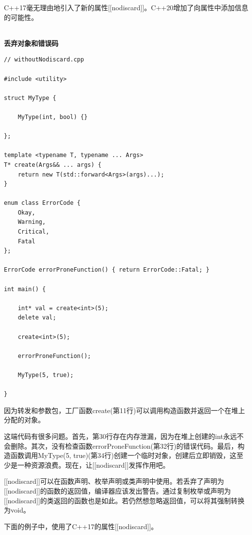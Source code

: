 
C++17毫无理由地引入了新的属性[[nodiscard]]。C++20增加了向属性中添加信息的可能性。

\hspace*{\fill} \\ %
\noindent
\textbf{丢弃对象和错误码}
\begin{lstlisting}[style=styleCXX]
// withoutNodiscard.cpp

#include <utility>

struct MyType {

	MyType(int, bool) {}

};

template <typename T, typename ... Args>
T* create(Args&& ... args) {
	return new T(std::forward<Args>(args)...);
}

enum class ErrorCode {
	Okay,
	Warning,
	Critical,
	Fatal
};

ErrorCode errorProneFunction() { return ErrorCode::Fatal; }

int main() {

	int* val = create<int>(5);
	delete val;
	
	create<int>(5);
	
	errorProneFunction();
	
	MyType(5, true);

}
\end{lstlisting}

因为转发和参数包，工厂函数create(第11行)可以调用构造函数并返回一个在堆上分配的对象。

这端代码有很多问题。首先，第30行存在内存泄漏，因为在堆上创建的int永远不会删除。其次，没有检查函数errorProneFunction(第32行)的错误代码。最后，构造函数调用MyType(5, true)(第34行)创建一个临时对象，创建后立即销毁，这至少是一种资源浪费。现在，让[[nodiscard]]发挥作用吧。

[[nodiscard]]可以在函数声明、枚举声明或类声明中使用。若丢弃了声明为[[nodiscard]]的函数的返回值，编译器应该发出警告。通过复制枚举或声明为[[nodiscard]]的类返回的函数也是如此。若仍然想忽略返回值，可以将其强制转换为void。

下面的例子中，使用了C++17的属性[[nodiscard]]。

